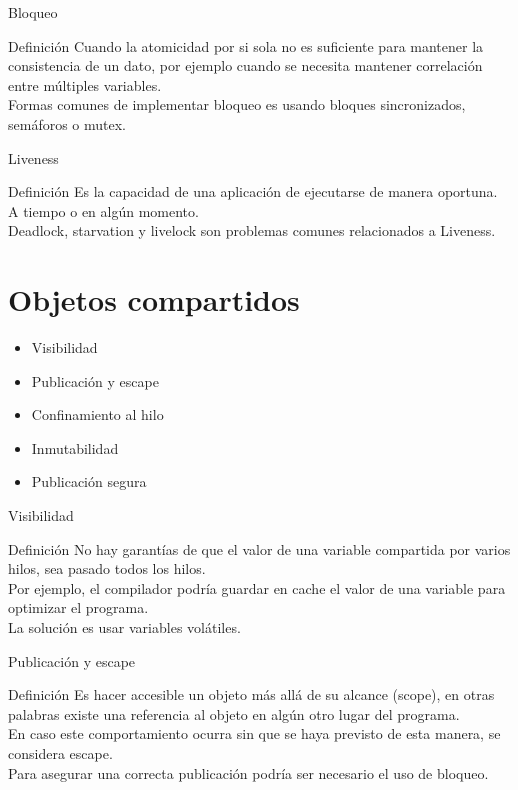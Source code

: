 \documentclass[aspectratio=169]{beamer}
\begin{document}
\begin{frame}{Bloqueo}
\begin{block}{Definición}
Cuando la atomicidad por si sola no es suficiente para mantener la consistencia
de un dato, por ejemplo cuando se necesita mantener correlación entre múltiples
variables.\\
Formas comunes de implementar bloqueo es usando bloques sincronizados,
semáforos o mutex.
\end{block}
\end{frame}

\begin{frame}{Liveness}
\begin{block}{Definición}
Es la capacidad de una aplicación de ejecutarse de manera oportuna. A tiempo
o en algún momento.\\
Deadlock, starvation y livelock son problemas comunes
relacionados a Liveness.
\end{block}
\end{frame}

\section{Objetos compartidos} %
\begin{frame}
\begin{itemize}
\item Visibilidad
\item Publicación y escape
\item Confinamiento al hilo
\item Inmutabilidad
\item Publicación segura
\end{itemize}
\end{frame}

\begin{frame}{Visibilidad}
\begin{block}{Definición}
No hay garantías de que el valor de una variable compartida por varios hilos,
sea pasado todos los hilos.\\
Por ejemplo, el compilador podría guardar en cache
el valor de una variable para optimizar el programa.\\
La solución es usar variables volátiles.
\end{block}
\end{frame}

\begin{frame}{Publicación y escape}
\begin{block}{Definición}
Es hacer accesible un objeto más allá de su alcance (scope), en otras palabras
existe una referencia al objeto en algún otro lugar del programa.\\
En caso este comportamiento ocurra sin que se haya previsto de esta manera, se
considera \alert{escape}.\\
Para asegurar una correcta publicación podría ser necesario el uso de bloqueo.
\end{block}
\end{frame}
\end{document}
